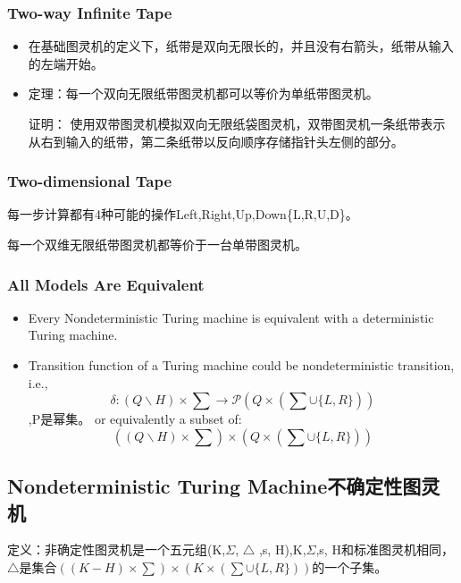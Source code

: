 \documentclass[UTF8]{ctexart}
\begin{document}
\begin{itemize}
\begin{itemize}
\end{itemize}
\subsubsection{Two-way Infinite Tape}

\begin{itemize}
    \item 在基础图灵机的定义下，纸带是双向无限长的，并且没有右箭头，纸带从输入的左端开始。
    \item 定理：每一个双向无限纸带图灵机都可以等价为单纸带图灵机。
    
    证明：
    使用双带图灵机模拟双向无限纸袋图灵机，双带图灵机一条纸带表示从右到输入的纸带，第二条纸带以反向顺序存储指针头左侧的部分。
\end{itemize}

\subsubsection{Two-dimensional Tape}
每一步计算都有4种可能的操作Left,Right,Up,Down\{L,R,U,D\}。

每一个双维无限纸带图灵机都等价于一台单带图灵机。

\subsubsection{All Models Are Equivalent}
\begin{itemize}
    \item Every Nondeterministic Turing machine is equivalent with a deterministic Turing machine.
    \item Transition function of a Turing machine could be nondeterministic transition, i.e., 
\[\delta:(Q \backslash H) × \sum \to \mathcal{P}(Q \times(\sum \cup\{L, R\}))\],P是幂集。
or equivalently a subset of: 
\[((Q \backslash H) × \sum) \times(Q \times(\sum \cup\{L, R\}))\]
\end{itemize}
    
\end{itemize}

\subsection{Nondeterministic Turing Machine不确定性图灵机}

定义：非确定性图灵机是一个五元组(K,$\Sigma $, $\bigtriangleup $ ,s, H),K,$\Sigma $,s, H和标准图灵机相同，$\bigtriangleup $是集合\(((K-H)\times\sum)\times(K\times(\sum\cup\{L,R\}))\)的一个子集。
\end{document}
